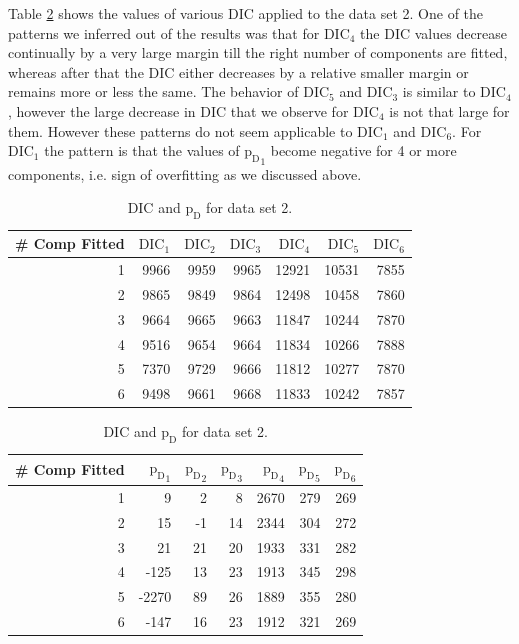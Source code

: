 Table \ref{table : ds_3wellsep_dic} shows the values of various DIC applied to the data set 2. One of the patterns we inferred out of the results was that for $\text{DIC}_4$ the DIC values decrease continually by a very large margin till the right number of components are fitted, whereas after that the DIC either decreases by a relative smaller margin or remains more or less the same. The behavior of $\text{DIC}_5$ and $\text{DIC}_3$ is similar to $\text{DIC}_4$, however the large decrease in DIC that we observe for $\text{DIC}_4$ is not that large for them. However these patterns do not seem applicable to $\text{DIC}_1$ and $\text{DIC}_6$. For $\text{DIC}_1$ the pattern is that the values of ${\text{p}_\text{D}}_1$ become negative for 4 or more components, i.e. sign of overfitting as we discussed above.

\begin{table}[!htb]
\centering
\caption{DIC and $\text{p}_\text{D}$ for data set 2.}
\label{table : ds_3wellsep_dic} 
\begin{tabular}{@{}rrrrrrr@{}}
\toprule
\# Comp Fitted & $\text{DIC}_1$ & $\text{DIC}_2$  & $\text{DIC}_3$  & $\text{DIC}_4$  & $\text{DIC}_5$  & $\text{DIC}_6$  \\ \midrule
1 & 9966 & 9959 & 9965 & 12921 & 10531 & 7855 \\
2 & 9865 & 9849 & 9864 & 12498 & 10458 & 7860 \\
3 & 9664 & 9665 & 9663 & 11847 & 10244 & 7870 \\
4 & 9516 & 9654 & 9664 & 11834 & 10266 & 7888 \\
5 & 7370 & 9729 & 9666 & 11812 & 10277 & 7870 \\
6 & 9498 & 9661 & 9668 & 11833 & 10242 & 7857 \\ \bottomrule
\end{tabular}

\begin{tabular}{@{}rrrrrrr@{}}
\toprule
\# Comp Fitted & ${\text{p}_\text{D}}_1$ & ${\text{p}_\text{D}}_2$ & ${\text{p}_\text{D}}_3$ & ${\text{p}_\text{D}}_4$ & ${\text{p}_\text{D}}_5$ & ${\text{p}_\text{D}}_6$ \\ \midrule
1 & 9 & 2 & 8 & 2670 & 279 & 269 \\
2 & 15 & -1 & 14 & 2344 & 304 & 272 \\
3 & 21 & 21 & 20 & 1933 & 331 & 282 \\
4 & -125 & 13 & 23 & 1913 & 345 & 298 \\
5 & -2270 & 89 & 26 & 1889 & 355 & 280 \\
6 & -147 & 16 & 23 & 1912 & 321 & 269 \\ \bottomrule
\end{tabular}
\end{table}

